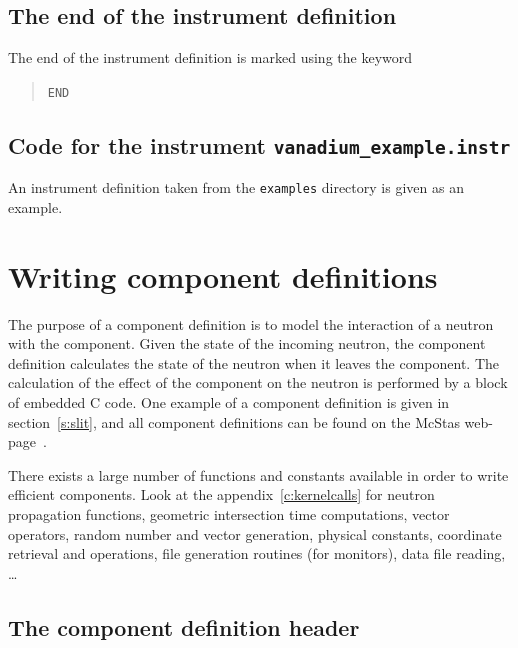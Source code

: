 \subsection{The end of the instrument definition}
\label{s:end}

The end of the instrument definition is marked using the keyword
\begin{quote}
  \texttt{END}
\end{quote}

\subsection{Code for the instrument \texttt{vanadium\_example.instr}}
\label{s:vanadium_example.instr}
An instrument definition taken from the \texttt{examples} directory is
given as an example.

\section{Writing component definitions}
\label{s:compdefs}

The purpose of a component definition is to model the interaction of a
neutron with the component. Given the state of the incoming neutron, the
component definition calculates the state of the neutron when it leaves
the component.  The calculation of the effect of the component on the
neutron is performed by a block of embedded C code.
One example of a component definition is given in section~\ref{s:slit}, and all
component definitions can be found on the McStas web-page~\cite{mcstas_webpage}.

There exists a large number of functions and constants available in
order to write efficient components. Look at the appendix~\ref{c:kernelcalls} for neutron propagation functions, geometric intersection time computations, vector operators, random number and vector generation, physical constants, coordinate retrieval and operations, file generation routines (for monitors), data file reading, \ldots



\subsection{The component definition header}
\label{s:comp-header}

